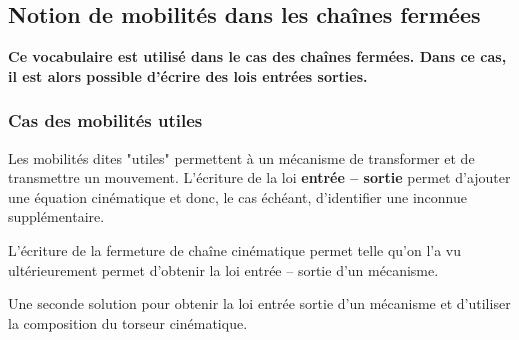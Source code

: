 \documentclass[10pt]{article}
\begin{document}






\subsection{Notion de mobilités dans les chaînes fermées}
\begin{warn}
\textbf{Ce vocabulaire est utilisé dans le cas des chaînes fermées. Dans ce cas, il est alors possible d'écrire des lois entrées sorties.}
\end{warn}

\subsubsection{Cas des mobilités utiles}

\begin{defi}

Les mobilités dites "utiles" permettent à un mécanisme de transformer et de transmettre un mouvement. L'écriture de la loi \textbf{entrée -- sortie} permet d'ajouter une équation cinématique et donc, le cas échéant, d'identifier une inconnue supplémentaire. 

\end{defi}

\begin{methode}
L'écriture de la fermeture de chaîne cinématique permet telle qu'on l'a vu ultérieurement permet d'obtenir la loi entrée -- sortie d'un mécanisme.

Une seconde solution pour obtenir la loi entrée sortie d'un mécanisme et d'utiliser la composition du torseur cinématique.
\end{methode}
\end{document}
